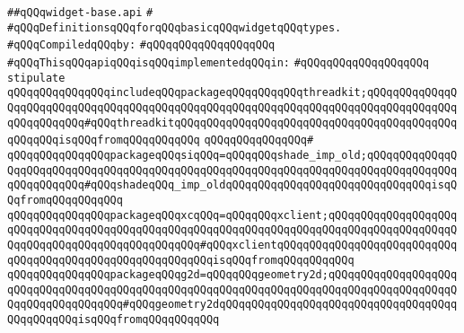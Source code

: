 \label{src/lib/x-kit/widget/old/basic/widget-base.api}
\verb|##qQQqwidget-base.api|\newline
\verb|#|\newline
\verb|#qQQqDefinitionsqQQqforqQQqbasicqQQqwidgetqQQqtypes.|\newline
\newline
\verb|#qQQqCompiledqQQqby:|\newline
\verb|#qQQqqQQqqQQqqQQqqQQq|\newline
\newline
\newline
\newline
\newline
\verb|#qQQqThisqQQqapiqQQqisqQQqimplementedqQQqin:|\newline
\verb|#qQQqqQQqqQQqqQQqqQQq|\newline
\newline
\verb|stipulate|\newline
\verb|qQQqqQQqqQQqqQQqincludeqQQqpackageqQQqqQQqqQQqthreadkit;qQQqqQQqqQQqqQQqqQQqqQQqqQQqqQQqqQQqqQQqqQQqqQQqqQQqqQQqqQQqqQQqqQQqqQQqqQQqqQQqqQQqqQQqqQQqqQQq#qQQqthreadkitqQQqqQQqqQQqqQQqqQQqqQQqqQQqqQQqqQQqqQQqqQQqqQQqqQQqisqQQqfromqQQqqQQqqQQq|\newline
\verb|qQQqqQQqqQQqqQQq#|\newline
\verb|qQQqqQQqqQQqqQQqpackageqQQqsiqQQq=qQQqqQQqshade_imp_old;qQQqqQQqqQQqqQQqqQQqqQQqqQQqqQQqqQQqqQQqqQQqqQQqqQQqqQQqqQQqqQQqqQQqqQQqqQQqqQQqqQQqqQQqqQQqqQQq#qQQqshadeqQQq_imp_oldqQQqqQQqqQQqqQQqqQQqqQQqqQQqqQQqisqQQqfromqQQqqQQqqQQq|\newline
\verb|qQQqqQQqqQQqqQQqpackageqQQqxcqQQq=qQQqqQQqxclient;qQQqqQQqqQQqqQQqqQQqqQQqqQQqqQQqqQQqqQQqqQQqqQQqqQQqqQQqqQQqqQQqqQQqqQQqqQQqqQQqqQQqqQQqqQQqqQQqqQQqqQQqqQQqqQQqqQQqqQQq#qQQqxclientqQQqqQQqqQQqqQQqqQQqqQQqqQQqqQQqqQQqqQQqqQQqqQQqqQQqqQQqqQQqisqQQqfromqQQqqQQqqQQq|\newline
\verb|qQQqqQQqqQQqqQQqpackageqQQqg2d=qQQqqQQqgeometry2d;qQQqqQQqqQQqqQQqqQQqqQQqqQQqqQQqqQQqqQQqqQQqqQQqqQQqqQQqqQQqqQQqqQQqqQQqqQQqqQQqqQQqqQQqqQQqqQQqqQQqqQQqqQQq#qQQqgeometry2dqQQqqQQqqQQqqQQqqQQqqQQqqQQqqQQqqQQqqQQqqQQqqQQqisqQQqfromqQQqqQQqqQQq|\newline
